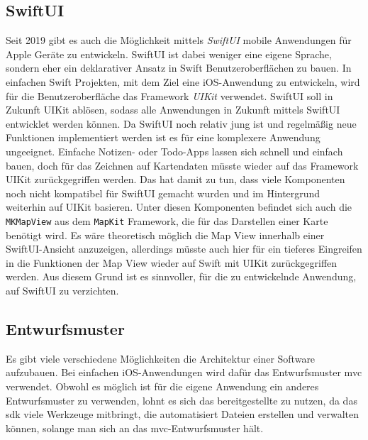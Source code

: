 \subsection{SwiftUI}
Seit 2019 gibt es auch die Möglichkeit mittels \textit{SwiftUI} mobile Anwendungen für Apple Geräte zu entwickeln.
SwiftUI ist dabei weniger eine eigene Sprache, sondern eher ein deklarativer Ansatz in Swift Benutzeroberflächen zu bauen.
In einfachen Swift Projekten, mit dem Ziel eine iOS-Anwendung zu entwickeln, wird für die Benutzeroberfläche das Framework \textit{UIKit} verwendet.
SwiftUI soll in Zukunft UIKit ablösen, sodass alle Anwendungen in Zukunft mittels SwiftUI entwicklet werden können.\pbreak%
%
Da SwiftUI noch relativ jung ist und regelmäßig neue Funktionen implementiert werden ist es für eine komplexere Anwendung ungeeignet.
Einfache Notizen- oder Todo-Apps lassen sich schnell und einfach bauen, doch für das Zeichnen auf Kartendaten müsste wieder auf das Framework UIKit zurückgegriffen werden.
Das hat damit zu tun, dass viele Komponenten noch nicht kompatibel für SwiftUI gemacht wurden und im Hintergrund weiterhin auf UIKit basieren.
Unter diesen Komponenten befindet sich auch die \texttt{MKMapView} aus dem \texttt{MapKit} Framework, die für das Darstellen einer Karte benötigt wird.
Es wäre theoretisch möglich die Map View innerhalb einer SwiftUI-Ansicht anzuzeigen, allerdings müsste auch hier für ein tieferes Eingreifen in die Funktionen der Map View wieder auf Swift mit UIKit zurückgegriffen werden.
Aus diesem Grund ist es sinnvoller, für die zu entwickelnde Anwendung, auf SwiftUI zu verzichten.

\subsection{Entwurfsmuster}
Es gibt viele verschiedene Möglichkeiten die Architektur einer Software aufzubauen.
Bei einfachen iOS-Anwendungen wird dafür das Entwurfsmuster \ac{mvc} verwendet.
Obwohl es möglich ist für die eigene Anwendung ein anderes Entwurfsmuster zu verwenden, lohnt es sich das bereitgestellte zu nutzen, da das \Gls{sdk} viele Werkzeuge mitbringt, die automatisiert Dateien erstellen und verwalten können, solange man sich an das \ac{mvc}-Entwurfsmuster hält.
